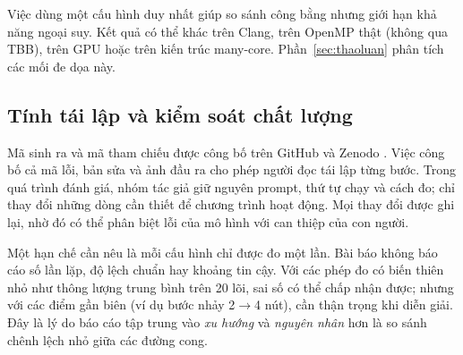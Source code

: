 Việc dùng một cấu hình duy nhất giúp so sánh công bằng nhưng giới hạn khả năng
ngoại suy. Kết quả có thể khác trên Clang, trên OpenMP thật (không qua TBB), trên
GPU hoặc trên kiến trúc many-core. Phần~\ref{sec:thaoluan} phân tích các mối đe
dọa này.

\subsection{Tính tái lập và kiểm soát chất lượng}

Mã sinh ra và mã tham chiếu được công bố trên GitHub và Zenodo \cite{diehl2026}.
Việc công bố cả mã lỗi, bản sửa và ảnh đầu ra cho phép người đọc tái lập từng
bước. Trong quá trình đánh giá, nhóm tác giả giữ nguyên prompt, thứ tự chạy và
cách đo; chỉ thay đổi những dòng cần thiết để chương trình hoạt động. Mọi thay
đổi được ghi lại, nhờ đó có thể phân biệt lỗi của mô hình với can thiệp của con
người.

Một hạn chế cần nêu là mỗi cấu hình chỉ được đo một lần. Bài báo không báo cáo
số lần lặp, độ lệch chuẩn hay khoảng tin cậy. Với các phép đo có biến thiên nhỏ
như thông lượng trung bình trên 20 lõi, sai số có thể chấp nhận được; nhưng với
các điểm gần biên (ví dụ bước nhảy 2$\to$4 nút), cần thận trọng khi diễn giải.
Đây là lý do báo cáo tập trung vào \emph{xu hướng} và \emph{nguyên nhân} hơn là
so sánh chênh lệch nhỏ giữa các đường cong.
